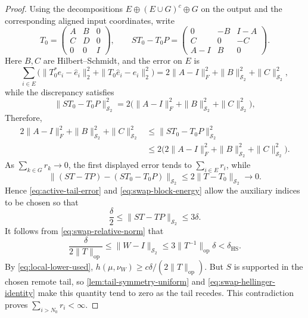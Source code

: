 \begin{proof}
Using the decompositions $E\oplus(E\cup G)^c\oplus G$ on the output and the
corresponding aligned input coordinates, write
\[
 T_0=\begin{pmatrix}A&B&0\\ C&D&0\\0&0&I\end{pmatrix},
 \qquad
 ST_0-T_0P=
 \begin{pmatrix}
 0&-B&I-A\\
 C&0&-C\\
 A-I&B&0
 \end{pmatrix}.
\]
Here $B,C$ are Hilbert--Schmidt, and the error on $E$ is
\[
 \sum_{i\in E}
 \bigl(\|T_0^*e_i-\widehat e_i\|_2^2
                    +\|T_0\widehat e_i-e_i\|_2^2\bigr)
 =2\|A-I\|_F^2+\|B\|_{\mathcal S_2}^2+\|C\|_{\mathcal S_2}^2,
\]
while the discrepancy satisfies
\[
 \|ST_0-T_0P\|_{\mathcal S_2}^2
 =2\bigl(\|A-I\|_F^2+\|B\|_{\mathcal S_2}^2
                         +\|C\|_{\mathcal S_2}^2\bigr),
\]
Therefore,
\begin{equation}
 \begin{aligned}
 2\|A-I\|_F^2+\|B\|_{\mathcal S_2}^2+\|C\|_{\mathcal S_2}^2
 &\leq\|ST_0-T_0P\|_{\mathcal S_2}^2\\
 &\leq2\bigl(2\|A-I\|_F^2+\|B\|_{\mathcal S_2}^2
                              +\|C\|_{\mathcal S_2}^2\bigr).
 \end{aligned}
 \label{eq:swap-block-energy}
\end{equation}
As $\sum_{k\in G}r_k\to0$, the first displayed error tends
to $\sum_{i\in E}r_i$, while
\[
 \|(ST-TP)-(ST_0-T_0P)\|_{\mathcal S_2}
 \leq2\|T-T_0\|_{\mathcal S_2}\longrightarrow0.
\]
Hence \eqref{eq:active-tail-error} and \eqref{eq:swap-block-energy} allow the auxiliary
indices to be chosen so that
\[
 \frac{\delta}{2}\leq\|ST-TP\|_{\mathcal S_2}\leq3\delta.
\]
It follows from \eqref{eq:swap-relative-norm} that
\[
 \frac{\delta}{2\|T\|_{\mathrm{op}}}
 \leq\|W-I\|_{\mathcal S_2}
 \leq3\|T^{-1}\|_{\mathrm{op}}\delta<\delta_{\mathrm{HS}}.
\]
By \eqref{eq:local-lower-used},
$h(\mu,\nu_W)\geq c\delta/(2\|T\|_{\mathrm{op}})$.
But $S$ is supported in the chosen remote tail, so
\cref{lem:tail-symmetry-uniform} and \eqref{eq:swap-hellinger-identity} make
this quantity tend to zero as the tail recedes.  This contradiction proves
$\sum_{i>N_0}r_i<\infty$.


\end{proof}
